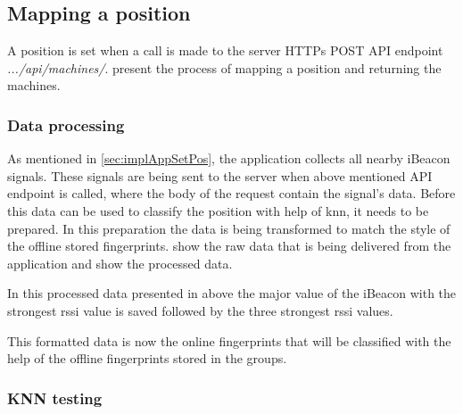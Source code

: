 \subsection{Mapping a position}\label{sec:implServerSetPos}
A position is set when a call is made to the server HTTPs POST API endpoint \textit{.../api/machines/}.
 present the process of mapping a position and returning the machines.


\subsubsection{Data processing}\label{sec:implServerSetPosDataProcessing}
As mentioned in \cref{sec:implAppSetPos}, the application collects all nearby iBeacon signals.
These signals are being sent to the server when above mentioned API endpoint is called, where the body of the request contain the signal's data.
Before this data can be used to classify the position with help of \acrfull{knn}, it needs to be prepared.
In this preparation the data is being transformed to match the style of the offline stored fingerprints.
 show the raw data that is being delivered from the application and  show the processed data.



In this processed data presented in  above the major value of the iBeacon with the strongest \acrshort{rssi} value is saved followed by the three strongest \acrshort{rssi} values.

\bigskip

This formatted data is now the online fingerprints that will be classified with the help of the offline fingerprints stored in the groups.


\subsubsection{KNN testing}\label{sec:implServerSetPosKnnTesting}

